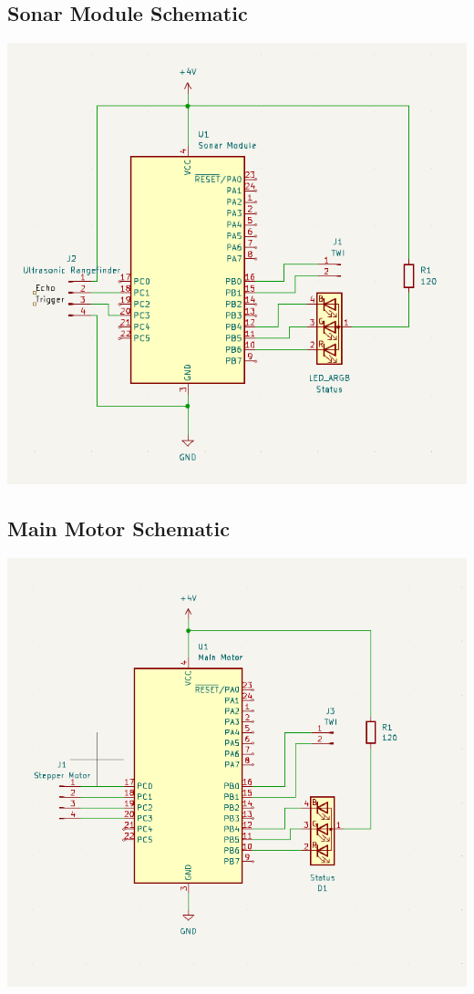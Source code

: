 \documentclass[11pt,a4paper,titlepage]{report}
\begin{document}
	\subsection{Sonar Module Schematic}\label{appendix:sonar_schematic}
	\begin{center}
		\label{picture:sonar_schematic}
		\includegraphics[width=\linewidth]{assets/SonarModuleSchematic.png}
	\end{center}
	\subsection{Main Motor Schematic}\label{appendix:main_motor_schematic}
	\begin{center}
		\label{picture:main_motor_schematic}
		\includegraphics[width=\linewidth]{assets/MainMotorSchematic.png}
	\end{center}
\end{document}
